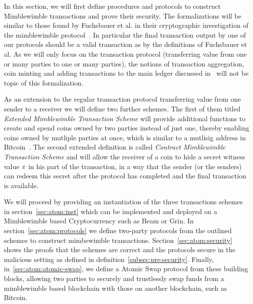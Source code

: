In this section, we will first define procedures and protocols to construct Mimblewimble transactions and prove their security.
The formalizations will be similar to those found by Fuchsbauer et al. in their cryptographic investigation of the mimblewimble  protocol~\cite{fuchsbauer2019aggregate}.
In particular the final transaction output by one of our protocols should be a valid transaction as by the definitions of Fuchsbauer et al.
As we will only focus on the transaction protocol (transferring value from one or many parties to one or many parties), the notions of transaction aggregation, coin minting and adding transactions to the main ledger discussed in~\cite{fuchsbauer2019aggregate} will not be topic of this formalization.


As an extension to the regular transaction protocol transferring value from one sender to a receiver we will define two further schemes.
The first of them titled \emph{Extended Mimblewimble Transaction Scheme} will provide additional functions to create and spend coins owned by two parties instead of just one, thereby enabling coins owned by mutliple parties at once, which is similar to a mutlisig address in Bitcoin~\cite{antonopoulos2014mastering}.
The second extended definition is called \emph{Contract Mimblewimble Transaction Scheme} and will allow the receiver
of a coin to hide a secret witness value $\mathit{x}$ in his part  of the transaction, in a way that the sender (or the senders) can redeem this secret after the protocol has completed and the final transaction is available.

We will proceed by providing an instantiation of the three  transactions schemes in section~\ref{sec:atom:inst} which can be implemented and deployed on a Mimblewimble based Cryptocurrency such as Beam or Grin.
In section~\ref{sec:atom:protocols} we define two-party protocols from the outlined schemes to construct mimbewimble transactions.
Section~\ref{sec:atom:security} shows the proofs that the schemes are correct and the protocols secure in the malicious setting as defined in definition~\ref{subsec:pre:security}.
Finally, in~\ref{sec:atom:atomic-swap}, we define a Atomic Swap protocol from these building blocks, allowing two parties to securely and trustlessly swap funds from a mimblewimble based blockchain with those on another blockchain, such as Bitcoin.

